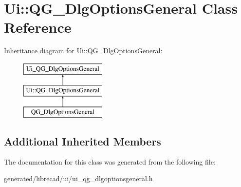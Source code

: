 \hypertarget{classUi_1_1QG__DlgOptionsGeneral}{\section{Ui\-:\-:Q\-G\-\_\-\-Dlg\-Options\-General Class Reference}
\label{classUi_1_1QG__DlgOptionsGeneral}
}
Inheritance diagram for Ui\-:\-:Q\-G\-\_\-\-Dlg\-Options\-General\-:\begin{figure}[H]
\begin{center}
\leavevmode
\includegraphics[height=3.000000cm]{classUi_1_1QG__DlgOptionsGeneral}
\end{center}
\end{figure}
\subsection*{Additional Inherited Members}


The documentation for this class was generated from the following file\-:\begin{DoxyCompactItemize}
\item 
generated/librecad/ui/ui\-\_\-qg\-\_\-dlgoptionsgeneral.\-h\end{DoxyCompactItemize}
